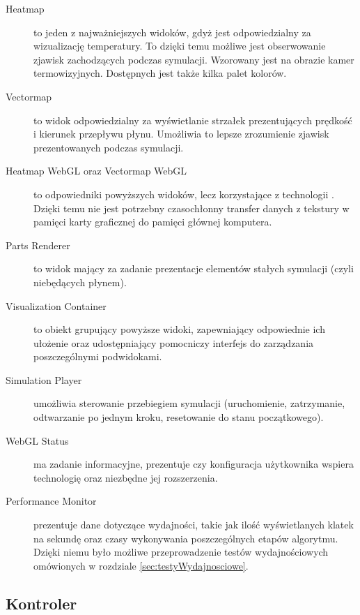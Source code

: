\begin{description}

\item[Heatmap] to jeden z najważniejszych widoków, gdyż jest odpowiedzialny
za wizualizację temperatury. To dzięki temu możliwe jest obserwowanie zjawisk
zachodzących podczas symulacji. Wzorowany jest na obrazie kamer termowizyjnych.
Dostępnych jest także kilka palet kolorów.

\item[Vectormap] to widok odpowiedzialny za wyświetlanie strzałek prezentujących
prędkość i kierunek przepływu płynu. Umożliwia to lepsze zrozumienie zjawisk
prezentowanych podczas symulacji.

\item[Heatmap WebGL oraz Vectormap WebGL] to odpowiedniki powyższych widoków,
lecz korzystające z technologii . Dzięki temu nie jest potrzebny
czasochłonny transfer danych z tekstury w pamięci karty graficznej do pamięci
głównej komputera.

\item[Parts Renderer] to widok mający za zadanie prezentacje elementów
stałych symulacji (czyli niebędących płynem).

\item[Visualization Container] to obiekt grupujący powyższe widoki, zapewniający
odpowiednie ich ułożenie oraz udostępniający pomocniczy interfejs do zarządzania
poszczególnymi podwidokami.

\item[Simulation Player] umożliwia sterowanie przebiegiem symulacji
(uruchomienie, zatrzymanie, odtwarzanie po jednym kroku, resetowanie do stanu
początkowego).

\item[WebGL Status] ma zadanie informacyjne, prezentuje czy konfiguracja
użytkownika wspiera technologię  oraz niezbędne jej rozszerzenia.

\item[Performance Monitor] prezentuje dane dotyczące wydajności, takie jak ilość
wyświetlanych klatek na sekundę oraz czasy wykonywania poszczególnych etapów
algorytmu. Dzięki niemu było możliwe przeprowadzenie testów wydajnościowych
omówionych w rozdziale \ref{sec:testyWydajnosciowe}.

\end{description}

\subsection{Kontroler}

